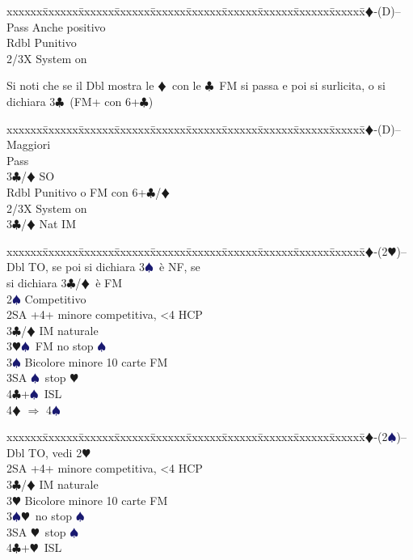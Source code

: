 \documentclass[a4paper,italian]{article}
\newcommand{\BC}{\textcolor{OliveGreen}{$\clubsuit$}}
\newcommand{\BD}{\textcolor{RedOrange}{$\vardiamondsuit$}}
\newcommand{\BH}{\textcolor{Red2}{$\varheartsuit${}}}
\newcommand{\BS}{\textcolor{MidnightBlue}{$\spadesuit${}}}
\newenvironment{bidtable}
{\begin{tabbing}

    xxxxxx\=xxxxxx\=xxxxxx\=xxxxxx\=xxxxxx\=xxxxxx\=xxxxxx\=xxxxxx\=xxxxxx\=xxxxxx\=\kill}
{\end{tabbing} }%
\begin{document}
\begin{multicols}{2}
    \begin{bidtable}
        2\BD-(D)--\+\\
        Pass \> Anche positivo\\
        Rdbl \> Punitivo\\
        2/3X \> System on\-
    \end{bidtable}
    Si noti che se il Dbl mostra le \BD\ con le \BC\ FM si passa e poi si surlicita, o si dichiara 3\BC\ (FM+ con 6+\BC )
    \begin{bidtable}
        2\BD-(D)-- \>\> Maggiori\+\\
        Pass\+\\
        3\BC/\BD \> SO\-\\
        Rdbl \> Punitivo o FM con 6+\BC /\BD \\
        2/3X \> System on\\
        3\BC/\BD \> Nat IM\-
    \end{bidtable}
    \begin{bidtable}
        2\BD-(2\BH)--\+\\
        Dbl \> TO, se poi si dichiara 3\BS\ è NF, se\+\\\-si dichiara 3\BC/\BD\ è FM\\
        2\BS \> Competitivo\\
        2SA +4+ minore competitiva, <4 HCP\\
        3\BC/\BD \> IM naturale\\
        3\BH {}\BS\ FM no stop \BS \\
        3\BS \> Bicolore minore 10 carte FM\\
        3SA \BS\ stop \BH \\
        4\BC {}+\BS\ ISL\\
        4\BD \> $\Rightarrow$ 4\BS \-
    \end{bidtable}
    \begin{bidtable}
        2\BD-(2\BS)--\+\\
        Dbl \> TO, vedi 2\BH \\
        2SA +4+ minore competitiva, <4 HCP\\
        3\BC/\BD \> IM naturale\\
        3\BH \> Bicolore minore 10 carte FM\\
        3\BS {}\BH\ no stop \BS \\
        3SA \BH\ stop \BS \\
        4\BC {}+\BH\ ISL\\

\end{bidtable}
\end{multicols}
\end{document}
